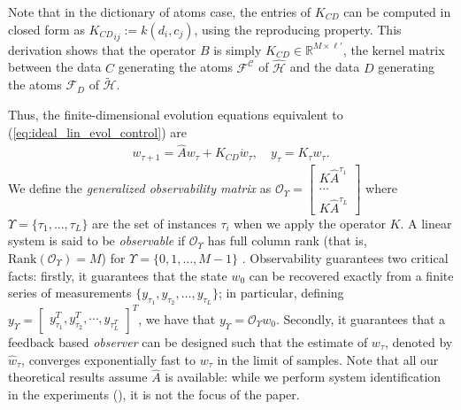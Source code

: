 \documentclass[letterpaper,12pt,peerreviewca,draftcls]{IEEEtran}
\newcommand{\R}{\mathbb{R}}
\newcommand{\weight}{w}
\newcommand{\estweight}{\widehat{w}}
\newcommand{\fspace}{\mathcal{H}}
\newcommand{\centers}{C}
\newcommand{\centerscontrol}{D}
\newcommand{\kernel}{k}
\newcommand{\empK}{\ensuremath{K}}
\newcommand{\ncent}{M}
\newcommand{\shCent}{\mathcal{C}}
\newcommand{\eqlabel}[1]{\label{eq:#1}}
\renewcommand{\eqref}[1]{(\ref{eq:#1})}
\newcommand{\Obs}{\mathcal{O}}
\newcommand{\otime}{L}
\newcommand{\Tset}{\Upsilon}
\newcommand{\fspaceD}{\ensuremath{\widetilde{\fspace}}}
\newcommand{\AtomsControl}{\mathcal{F}_{\centerscontrol}}
\newcommand{\fspaceApprox}{\widehat{\fspace}}
\newcommand{\Atoms}{\mathcal{F}^{\shCent}}
\newcommand{\ncontrol}{\ell'}
\newcommand{\weightc}{\acute{\weight}}
\newcommand{\empKCD}{\empK_{\centers\centerscontrol}}
\newcommand{\dualop}{A}
\newcommand{\dualopApprox}{\widehat{\dualop}}
\newcommand{\tindex}{\tau}
\begin{document}
Note that in the dictionary of atoms case, the entries of $\empKCD$ can be computed in closed form as ${\empKCD}_{ij}:= \kernel(d_i, c_j)$,
using the reproducing property. 
This derivation shows that the operator $B$ is simply $\empKCD\in\R^{\ncent\times\ncontrol}$, the kernel matrix between the data $\centers$ generating the atoms $\Atoms$ of $\fspaceApprox$ and the data $\centerscontrol$ generating the atoms $\AtomsControl$ of $\fspaceD$. 

Thus, the finite-dimensional evolution equations equivalent to \eqref{ideal_lin_evol_control} are
\begin{align}
 \weight_{\tindex+1} = \dualopApprox\weight_{\tindex} + \empKCD\weightc_{\tindex}, \quad
 y_{\tindex} = \empK_{\tindex} w_{\tindex} \eqlabel{k_measure_c1}.
\end{align}
We define the \emph{generalized observability matrix} \cite{zhou:bk:96} as 
$  \Obs_{\Tset} = 
 \left[
 \begin{smallmatrix}
  \empK \dualopApprox^{\tindex_1}\\
  \cdots\\
  \empK \dualopApprox^{\tindex_\otime}
 \end{smallmatrix}
 \right] $ 
where $\Tset = \{\tindex_1, \dots, \tindex_{\otime}\}$ are the set of instances $\tindex_i$
when we apply the operator $\empK$. A linear system is said to be \emph{observable} if $\Obs_{\Tset}$ has full column rank (that is, $\mathrm{Rank} (\Obs_{\Tset})=\ncent$) for 
$\Tset = \{0, 1, \dots, \ncent-1\}$ \cite{zhou:bk:96}. Observability guarantees two critical facts: firstly, it guarantees that the state $\weight_0$ can be recovered exactly from a finite series of measurements $\{y_{{\tindex}_1}, y_{{\tindex}_2}, \dots, y_{{\tindex}_{\otime}}\}$; in particular, defining $y_{\Tset} = \begin{bmatrix}y_{{\tindex}_1}^T, y_{{\tindex}_2}^T, \cdots, y_{{\tindex}_{\otime}^T}\end{bmatrix}^T$, we have that $y_{\Tset} = \Obs_{\Tset}\weight_0.$  Secondly, it guarantees that a feedback based \emph{observer} can be designed such that the estimate of $\weight_{\tindex}$, denoted by $\estweight_{\tindex}$, converges exponentially fast to $\weight_{\tindex}$ in the limit of samples. Note that all our theoretical results assume $\dualopApprox$ is available: while we perform system identification in the experiments (\cite{Kingravi16_NIPS}), it is not the focus of the paper. 
\end{document}
